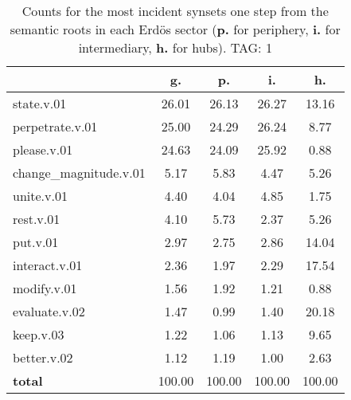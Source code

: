 \begin{table}[h!]
\begin{center}
\begin{tabular}{| l | c | c | c | c |}\hline
 & g. & p. & i. & h. \\\hline
state.v.01 & 26.01  & 26.13  & 26.27  & 13.16 \\\hline
perpetrate.v.01 & 25.00  & 24.29  & 26.24  & 8.77 \\\hline
please.v.01 & 24.63  & 24.09  & 25.92  & 0.88 \\\hline
change\_magnitude.v.01 & 5.17  & 5.83  & 4.47  & 5.26 \\\hline
unite.v.01 & 4.40  & 4.04  & 4.85  & 1.75 \\\hline
rest.v.01 & 4.10  & 5.73  & 2.37  & 5.26 \\\hline
put.v.01 & 2.97  & 2.75  & 2.86  & 14.04 \\\hline
interact.v.01 & 2.36  & 1.97  & 2.29  & 17.54 \\\hline
modify.v.01 & 1.56  & 1.92  & 1.21  & 0.88 \\\hline
evaluate.v.02 & 1.47  & 0.99  & 1.40  & 20.18 \\\hline
keep.v.03 & 1.22  & 1.06  & 1.13  & 9.65 \\\hline
better.v.02 & 1.12  & 1.19  & 1.00  & 2.63 \\\hline
{{\bf total}} & 100.00  & 100.00  & 100.00  & 100.00 \\\hline
\end{tabular}
\caption{Counts for the most incident synsets one step from the semantic roots in each Erd\"os sector ({\bf p.} for periphery, {\bf i.} for intermediary, {\bf h.} for hubs). TAG: 1}
\end{center}
\end{table}
